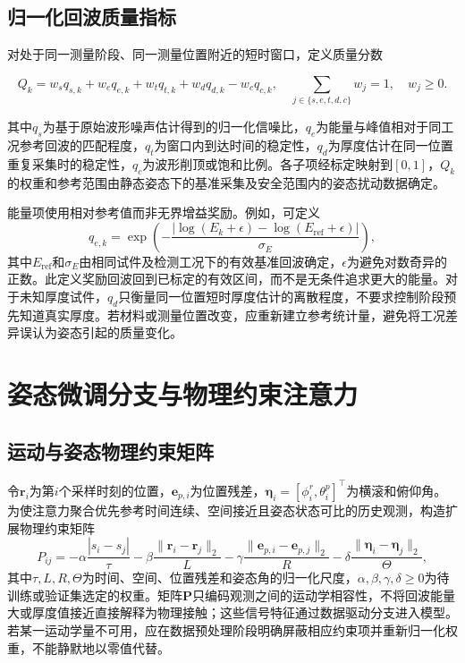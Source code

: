 \subsection{归一化回波质量指标}

对处于同一测量阶段、同一测量位置附近的短时窗口，定义质量分数

\begin{equation}
Q_k =
w_s q_{s,k}
+w_e q_{e,k}
+w_t q_{t,k}
+w_d q_{d,k}
-w_c q_{c,k},
\quad
\sum_{j\in\{s,e,t,d,c\}} w_j = 1,\quad w_j\geq 0 .
\label{eq:c4_quality_score}
\end{equation}

其中$q_s$为基于原始波形噪声估计得到的归一化信噪比，$q_e$为能量与峰值相对于同工况参考回波的匹配程度，$q_t$为窗口内到达时间的稳定性，$q_d$为厚度估计在同一位置重复采集时的稳定性，$q_c$为波形削顶或饱和比例。各子项经标定映射到$[0,1]$，$Q_k$的权重和参考范围由静态姿态下的基准采集及安全范围内的姿态扰动数据确定。

能量项使用相对参考值而非无界增益奖励。例如，可定义
\begin{equation}
q_{e,k} =
\exp\left(
-\frac{\left|\log(E_k+\epsilon)-\log(E_{\mathrm{ref}}+\epsilon)\right|}
{\sigma_E}
\right),
\label{eq:c4_energy_quality}
\end{equation}
其中$E_{\mathrm{ref}}$和$\sigma_E$由相同试件及检测工况下的有效基准回波确定，$\epsilon$为避免对数奇异的正数。此定义奖励回波回到已标定的有效区间，而不是无条件追求更大的能量。对于未知厚度试件，$q_d$只衡量同一位置短时厚度估计的离散程度，不要求控制阶段预先知道真实厚度。若材料或测量位置改变，应重新建立参考统计量，避免将工况差异误认为姿态引起的质量变化。

\section{姿态微调分支与物理约束注意力}

\subsection{运动与姿态物理约束矩阵}

令$\mathbf{r}_i$为第$i$个采样时刻的位置，$\mathbf{e}_{p,i}$为位置残差，$\boldsymbol{\eta}_i=[\phi_i^r,\theta_i^p]^\top$为横滚和俯仰角。为使注意力聚合优先参考时间连续、空间接近且姿态状态可比的历史观测，构造扩展物理约束矩阵
\begin{equation}
P_{ij} =
-\alpha\frac{|s_i-s_j|}{\tau}
-\beta\frac{\|\mathbf{r}_i-\mathbf{r}_j\|_2}{L}
-\gamma\frac{\|\mathbf{e}_{p,i}-\mathbf{e}_{p,j}\|_2}{R}
-\delta\frac{\|\boldsymbol{\eta}_i-\boldsymbol{\eta}_j\|_2}{\Theta},
\label{eq:c4_physics_matrix}
\end{equation}
其中$\tau,L,R,\Theta$为时间、空间、位置残差和姿态角的归一化尺度，$\alpha,\beta,\gamma,\delta\geq0$为待训练或验证集选定的权重。矩阵$\mathbf{P}$只编码观测之间的运动学相容性，不将回波能量大或厚度值接近直接解释为物理接触；这些信号特征通过数据驱动分支进入模型。若某一运动学量不可用，应在数据预处理阶段明确屏蔽相应约束项并重新归一化权重，不能静默地以零值代替。

